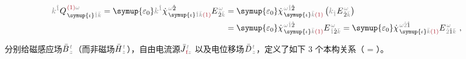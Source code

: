 \begin{subequations}
\begin{align}
	\mathcolor{gray}{k^{\hat{1}}} Q^{\;\! \textcolor{Maroon}{(1)} \mathcolor{gray}{\omega}}_{\;\! \symup{\iota} \mathcolor{gray}{\hat{1}} \mathcolor{gray}{\bar{k}}} = {\symup{\varepsilon_0}} \mathcolor{gray}{k^{\hat{1}}} \dot{\chi}^{\;\! \mathcolor{gray}{\omega} \hat{2}}_{\;\! \symup{\iota} \mathcolor{gray}{\hat{1}} \mathcolor{gray}{\bar{k}} \textcolor{Maroon}{(1)}} E^{\;\!\mathcolor{gray}{\omega}}_{\;\! \hat{2} \mathcolor{gray}{\bar{k}}} &= {\symup{\varepsilon_0}} \dot{\chi}^{\;\! \mathcolor{gray}{\omega} \mathcolor{gray}{\hat{1}} \hat{2} }_{\;\! \symup{\iota} \mathcolor{gray}{\bar{k}} \textcolor{Maroon}{(1)}} \left( \mathcolor{gray}{k_{\hat{1}}} E^{\;\!\mathcolor{gray}{\omega}}_{\;\! \hat{2} \mathcolor{gray}{\bar{k}}} \right) \label{div-Q(1)_wk} \\ &= {\symup{\varepsilon_0}} \dot{\chi}^{\;\! \mathcolor{gray}{\omega} \mathcolor{gray}{\hat{1}} \hat{2} }_{\;\! \symup{\iota} \mathcolor{gray}{\bar{k}} \textcolor{Maroon}{(1)}} E^{\;\!\mathcolor{gray}{\omega}}_{\;\! \mathcolor{gray}{\hat{1}} \hat{2} \mathcolor{gray}{\bar{k}}} = {\symup{\varepsilon_0}} \dot{\chi}^{\;\! \mathcolor{gray}{\omega} \mathcolor{gray}{\hat{2}} \hat{1} }_{\;\! \symup{\iota} \mathcolor{gray}{\bar{k}} \textcolor{Maroon}{(1)}} E^{\;\!\mathcolor{gray}{\omega}}_{\;\! \mathcolor{gray}{\hat{2}} \hat{1} \mathcolor{gray}{\bar{k}}}~,
\end{align}
\end{subequations}

分别给磁感应场$\bar{B}^{\;\!\mathcolor{gray}{t}}_{\;\!\mathcolor{gray}{z}}$（而非磁场$\bar{H}^{\;\!\mathcolor{gray}{t}}_{\;\!\mathcolor{gray}{z}}$），自由电流源$\bar{J}^{\;\!\mathcolor{gray}{t}}_{\;\!\textcolor{Maroon}{\text{f}}\mathcolor{gray}{z}}$ 以及电位移场$\bar{D}^{\;\!\mathcolor{gray}{t}}_{\;\!\mathcolor{gray}{z}}$，定义了如下 3 个本构关系（\textcolor{Maroon}{} = \textcolor{Maroon}{}）。

